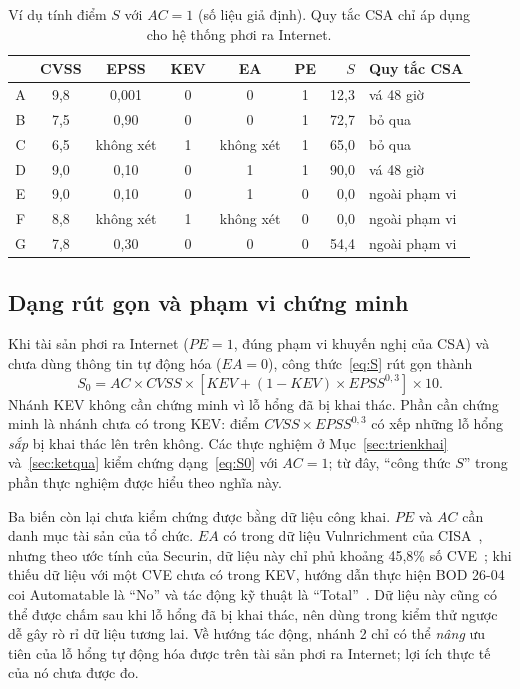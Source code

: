\documentclass[conference]{IEEEtran}
\begin{document}
\begin{table}[t]
\centering
\caption{Ví dụ tính điểm $S$ với $AC = 1$ (số liệu giả định). Quy tắc CSA chỉ áp dụng cho hệ thống phơi ra Internet.}\label{tab:vidu}
\footnotesize
\setlength{\tabcolsep}{3.5pt}
\begin{tabular}{ccccccrl}
\toprule
 & CVSS & EPSS & KEV & EA & PE & $S$ & Quy tắc CSA \\
\midrule
A & 9,8 & 0,001 & 0 & 0 & 1 & 12,3 & vá 48 giờ \\
B & 7,5 & 0,90 & 0 & 0 & 1 & 72,7 & bỏ qua \\
C & 6,5 & không xét & 1 & không xét & 1 & 65,0 & bỏ qua \\
D & 9,0 & 0,10 & 0 & 1 & 1 & 90,0 & vá 48 giờ \\
E & 9,0 & 0,10 & 0 & 1 & 0 & 0,0 & ngoài phạm vi \\
F & 8,8 & không xét & 1 & không xét & 0 & 0,0 & ngoài phạm vi \\
G & 7,8 & 0,30 & 0 & 0 & 0 & 54,4 & ngoài phạm vi \\
\bottomrule
\end{tabular}
\end{table}

\subsection{Dạng rút gọn và phạm vi chứng minh}

Khi tài sản phơi ra Internet ($\mathit{PE} = 1$, đúng phạm vi khuyến nghị của CSA) và chưa dùng thông
tin tự động hóa ($\mathit{EA} = 0$), công thức~\eqref{eq:S} rút gọn thành
\begin{equation}
S_0 = AC \times \mathit{CVSS} \times \left[\mathit{KEV} + (1-\mathit{KEV}) \times \mathit{EPSS}^{0{,}3}\right] \times 10.
\label{eq:S0}
\end{equation}
Nhánh KEV không cần chứng minh vì lỗ hổng đã bị khai thác. Phần cần chứng minh là nhánh chưa có trong KEV: điểm
$\mathit{CVSS} \times \mathit{EPSS}^{0{,}3}$ có xếp những lỗ hổng \emph{sắp} bị khai thác lên trên không.
Các thực nghiệm ở Mục~\ref{sec:trienkhai} và~\ref{sec:ketqua} kiểm chứng dạng~\eqref{eq:S0} với $AC = 1$;
từ đây, ``công thức $S$'' trong phần thực nghiệm được hiểu theo nghĩa này.

Ba biến còn lại chưa kiểm chứng được bằng dữ liệu công khai. $\mathit{PE}$ và $AC$ cần danh mục tài sản
của tổ chức. $\mathit{EA}$ có trong dữ liệu Vulnrichment của CISA~\cite{vulnrichment}, nhưng theo ước tính của Securin, dữ liệu này
chỉ phủ khoảng 45,8\% số CVE~\cite{securin2026}; khi thiếu dữ liệu với một CVE chưa có trong KEV, hướng dẫn thực hiện BOD 26-04 coi Automatable là ``No'' và tác động kỹ thuật là ``Total''~\cite{bod2604ig}. Dữ liệu này cũng có thể được chấm sau khi lỗ hổng
đã bị khai thác, nên dùng trong kiểm thử ngược dễ gây rò rỉ dữ liệu tương lai. Về hướng tác động, nhánh 2
chỉ có thể \emph{nâng} ưu tiên của lỗ hổng tự động hóa được trên tài sản phơi ra Internet; lợi ích thực tế
của nó chưa được đo.
\end{document}
